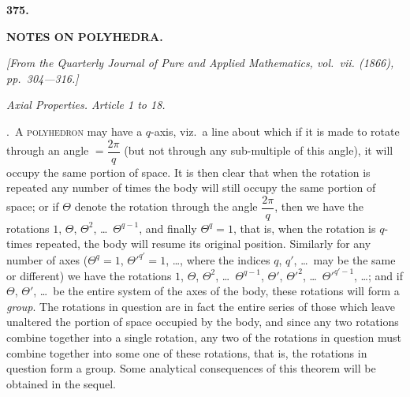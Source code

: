 \documentclass[11pt,a4paper]{article}
\begin{document}
\vspace{24pt}



\newpage
\begin{center}
\textbf{375.}
\end{center}
\vspace{-8pt}

\begin{center}
\textbf{NOTES ON POLYHEDRA.}
\end{center}

\begin{flushright}
\small\textit{[From the Quarterly Journal of Pure and Applied Mathematics, vol.~vii. (1866), pp.~304---316.]}
\end{flushright}

\vspace{6pt}

\begin{center}
\textit{Axial Properties. Article 1 to 18.}
\end{center}

\vspace{6pt}

.~\textsc{A polyhedron} may have a $q$-axis, viz.~a line about which if it is made to rotate through an angle $= \dfrac{2\pi}{q}$ (but not through any sub-multiple of this angle), it will occupy the same portion of space. It is then clear that when the rotation is repeated any number of times the body will still occupy the same portion of space; or if $\Theta$ denote the rotation through the angle $\dfrac{2\pi}{q}$, then we have the rotations $1$, $\Theta$, $\Theta^{2}$, \ldots\ $\Theta^{q-1}$, and finally $\Theta^{q} = 1$, that is, when the rotation is $q$-times repeated, the body will resume its original position. Similarly for any number of axes ($\Theta^{q} = 1$, $\Theta'^{q'} = 1$, \ldots, where the indices $q$, $q'$, \ldots\ may be the same or different) we have the rotations $1$, $\Theta$, $\Theta^{2}$, \ldots\ $\Theta^{q-1}$, $\Theta'$, $\Theta'^{2}$, \ldots\ $\Theta'^{q'-1}$, \ldots; and if $\Theta$, $\Theta'$, \ldots\ be the entire system of the axes of the body, these rotations will form a \textit{group}. The rotations in question are in fact the entire series of those which leave unaltered the portion of space occupied by the body, and since any two rotations combine together into a single rotation, any two of the rotations in question must combine together into some one of these rotations, that is, the rotations in question form a group. Some analytical consequences of this theorem will be obtained in the sequel.
\end{document}
